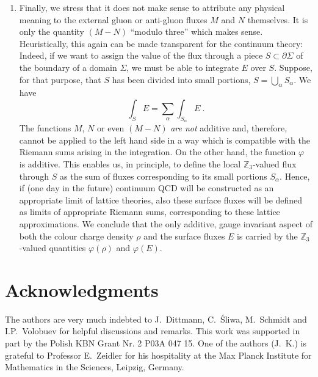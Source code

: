 \documentclass[a4paper,12pt]{article}
\begin{document}
\begin{enumerate}
\item
Finally, we stress that it does not make sense to attribute any
physical meaning to the external gluon or anti-gluon fluxes $M$
and $N$ themselves. It is only the quantity $(M-N)$ ``modulo
three'' which makes sense. Heuristically, this again can be made
transparent for the continuum theory: Indeed, if we want to assign
the value of the flux through a piece $S \subset \partial \Sigma$
of the boundary of a domain $\Sigma$, we must be able to integrate
$E$ over $S$. Suppose, for that purpose, that $S$ has been divided
into small portions, $S = \bigcup_\alpha S_\alpha$. We have
\begin{equation}\label{sum}
  \int_S E = \sum_\alpha \int_{S_\alpha} E \ .
\end{equation}
The functions $M$, $N$ or even $(M-N)$ {\em are not} additive and,
therefore, cannot be applied to the left hand side in a way which
is compatible with the Riemann sums arising in the integration. On
the other hand, the function $\varphi$ is additive. This enables
us, in principle, to define the local ${\mathbb Z}_3$-valued flux
through $S$ as the sum of fluxes corresponding to its small
portions $S_\alpha$. Hence, if (one day in the future) continuum
QCD will be constructed as an appropriate limit of lattice
theories, also these surface fluxes will be defined as limits of
appropriate Riemann sums, corresponding to these lattice
approximations. We conclude that the only additive, gauge
invariant aspect of both the colour charge density $\rho$ and the
surface fluxes $E$ is carried by the ${\mathbb Z}_3$-valued
quantities $\varphi(\rho )$ and $\varphi(E)$.
\end{enumerate}




\section*{Acknowledgments}

The authors are very much indebted to J.~Dittmann, C.~\'Sliwa,
M.~Schmidt and I.P.~Volo\-bu\-ev for helpful discussions and
remarks. This work was supported in part by the Polish KBN Grant
Nr. 2 P03A 047 15. One of the authors (J.~K.) is grateful to
Professor E.~Zeidler for his hospitality at the Max Planck
Institute for Mathematics in the Sciences, Leipzig, Germany.
\end{document}
